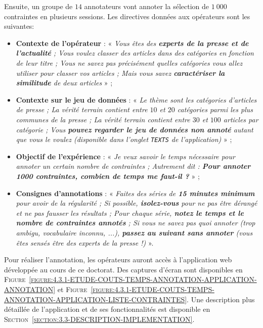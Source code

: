 			Ensuite, un groupe de $14$ annotateurs vont annoter la sélection de $1~000$ contraintes en plusieurs sessions.
			Les directives données aux opérateurs sont les suivantes:
			\begin{itemize}
				\item \textbf{Contexte de l'opérateur} :
				« \textit{Vous êtes des \textbf{experts de la presse et de l’actualité} ; Vous voulez classer des articles dans des catégories en fonction de leur titre ; Vous ne savez pas précisément quelles catégories vous allez utiliser pour classer vos articles ; Mais vous savez \textbf{caractériser la similitude} de deux articles} » ;
				\item \textbf{Contexte sur le jeu de données} :
				« \textit{Le thème sont les catégories d’articles de presse ; La vérité terrain contient entre $10$ et $20$ catégories parmi les plus communes de la presse ; La vérité terrain contient entre $30$ et $100$ articles par catégorie ; Vous \textbf{pouvez regarder le jeu de données non annoté} autant que vous le voulez (disponible dans l'onglet \texttt{TEXTS} de l'application)} » ;
				\item \textbf{Objectif de l'expérience} :
				« \textit{Je veux savoir le temps nécessaire pour annoter un certain nombre de contraintes ; Autrement dit : \textbf{Pour annoter 1000 contraintes, combien de temps me faut-il ?}} » ;
				\item \textbf{Consignes d'annotations} :
				« \textit{Faites des séries de \textbf{15 minutes minimum} pour avoir de la régularité ; Si possible, \textbf{isolez-vous} pour ne pas être dérangé et ne pas fausser les résultats ; Pour chaque série, \textbf{notez le temps et le nombre de contraintes annotés} ; Si vous ne savez pas quoi annoter (trop ambigu, vocabulaire inconnu, ...), \textbf{passez au suivant sans annoter} (vous êtes sensés être des experts de la presse !)} ».
			\end{itemize}
			Pour réaliser l'annotation, les opérateurs auront accès à l'application web développée au cours de ce doctorat.
			Des captures d'écran sont disponibles en \textsc{Figure~\ref{figure:4.3.1-ETUDE-COUTS-TEMPS-ANNOTATION-APPLICATION-ANNOTATION}} et \textsc{Figure~\ref{figure:4.3.1-ETUDE-COUTS-TEMPS-ANNOTATION-APPLICATION-LISTE-CONTRAINTES}}.
			Une description plus détaillée de l'application et de ses fonctionnalités est disponible en \textsc{Section~\ref{section:3.3-DESCRIPTION-IMPLEMENTATION}}.
